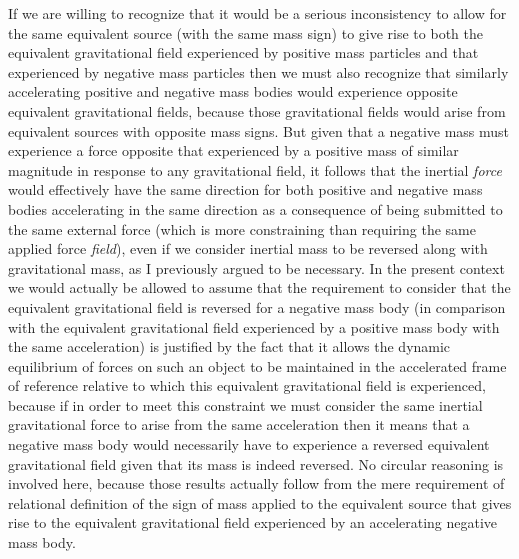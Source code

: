 \documentclass[notitlepage,12pt]{report}
\begin{document}
If we are willing to recognize that it would be a serious inconsistency to allow for the same equivalent source (with the same mass sign) to give rise to both the equivalent gravitational field experienced by positive mass particles and that experienced by negative mass particles then we must also recognize that similarly accelerating positive and negative mass bodies would experience opposite equivalent gravitational fields, because those gravitational fields would arise from equivalent sources with opposite mass signs. But given that a negative mass must experience a force opposite that experienced by a positive mass of similar magnitude in response to any gravitational field, it follows that the inertial \textit{force} would effectively have the same direction for both positive and negative mass bodies accelerating in the same direction as a consequence of being submitted to the same external force (which is more constraining than requiring the same applied force \textit{field}), even if we consider inertial mass to be reversed along with gravitational mass, as I previously argued to be necessary. In the present context we would actually be allowed to assume that the requirement to consider that the equivalent gravitational field is reversed for a negative mass body (in comparison with the equivalent gravitational field experienced by a positive mass body with the same acceleration) is justified by the fact that it allows the dynamic equilibrium of forces on such an object to be maintained in the accelerated frame of reference relative to which this equivalent gravitational field is experienced, because if in order to meet this constraint we must consider the same inertial gravitational force to arise from the same acceleration then it means that a negative mass body would necessarily have to experience a reversed equivalent gravitational field given that its mass is indeed reversed. No circular reasoning is involved here, because those results actually follow from the mere requirement of relational definition of the sign of mass applied to the equivalent source that gives rise to the equivalent gravitational field experienced by an accelerating negative mass body.
\end{document}
